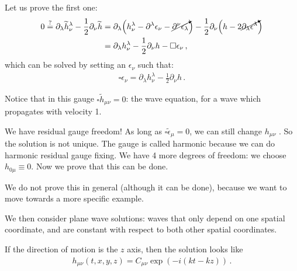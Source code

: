 \documentclass[main.tex]{subfiles}
\begin{document}
Let us prove the first one: 
%
\begin{align}
0 \overset{?}{=} \partial_{\lambda } \widetilde{h}^{\lambda }_{\nu } - \frac{1}{2} \partial_{\nu }\widetilde{h}
&= \partial_{\lambda } \qty( h^{\lambda }_{\nu } - \partial^{\lambda } \epsilon_{\nu } - \cancelto{}{\partial^{\nu } \epsilon_{\lambda }} ) - \frac{1}{2} \partial_{\nu } \qty(h - 2 \cancelto{}{\partial_{\lambda } \epsilon^{\lambda }})  \\
&= \partial_{\lambda } h^{\lambda }_{\nu } - \frac{1}{2} \partial_{\nu } h  - \square \epsilon_{\nu }
\,,
\end{align}
%
which can be solved by setting an \(\epsilon_{\nu }\) such that:
%
\begin{align}
  \square  \epsilon_{\nu } = \partial_{\lambda } h^{\lambda }_{\nu } - \frac{1}{2} \partial_{\nu } h
\,.
\end{align}

Notice that in this gauge \(\square \widetilde{h}_{\mu \nu } = 0 \): the wave equation, for a wave which propagates with velocity 1. 

We have residual gauge freedom! As long as \(\square \widetilde{\epsilon}_{\mu} = 0\), we can still change \(h_{\mu \nu }\) .
So the solution is not unique. The gauge is called harmonic because we can do harmonic residual gauge fixing. 
We have 4 more degrees of freedom: we choose \(h_{0 \mu } \equiv 0\). Now we prove that this can be done. 

We do not prove this in general (although it can be done), because we want to move towards a more specific example. 

We then consider plane wave solutions: waves that only depend on one spatial coordinate, and are constant with respect to both other spatial coordinates. 

If the direction of motion is the \(z\) axis, then the solution looks like 
%
\begin{align}
h_{\mu \nu } (t, x, y, z) = C_{\mu \nu } \exp(-i (k t - k z ))
\,.
\end{align}
\end{document}
